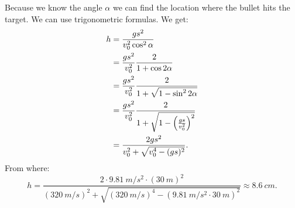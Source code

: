Because we know the angle $\alpha$ we can find the location where the bullet hits the target. We can use trigonometric formulas. We get:
\begin{align*}
h & = {gs^2 \over v_{0}^2\cos^2\alpha}\\
& = {gs^2 \over v_{0}^2}{2 \over 1+\cos2\alpha}\\
& = {gs^2 \over v_{0}^2}{2 \over 1+\sqrt{1-\sin^2 2\alpha}}\\
& = {gs^2 \over v_{0}^2}{2 \over 1+\sqrt{1-\Big({gs \over v_0^2}\Big)^2}}\\
& = {2gs^2 \over v_0^2+\sqrt{v_0^4-(gs)^2}}.
\end{align*}
From where:
$$
h  = \frac{2\cdot \SI{9,81}{m/s^2} \cdot (\SI{30}{m})^2}{(\SI{320}{m/s})^2+\sqrt{(\SI{320}{m/s})^4-(\SI{9,81}{m/s^2} \cdot \SI{30}{m})^2}} \approx \SI{8,6}{cm}.
$$
\probend